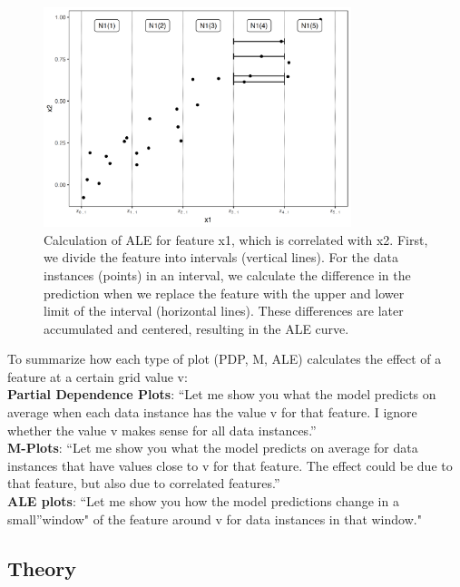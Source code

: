 \documentclass[
  10pt,
]{scrbook}
\begin{document}
\begin{figure}

{\centering \includegraphics[width=0.8\textwidth]{images/aleplot-computation-1} 

}

\caption{Calculation of ALE for feature x1, which is correlated with x2. First, we divide the feature into intervals (vertical lines). For the data instances (points) in an interval, we calculate the difference in the prediction when we replace the feature with the upper and lower limit of the interval (horizontal lines). These differences are later accumulated and centered, resulting in the ALE curve.}\label{fig:aleplot-computation}
\end{figure}

To summarize how each type of plot (PDP, M, ALE) calculates the effect of a feature at a certain grid value v:\\
\textbf{Partial Dependence Plots}: ``Let me show you what the model predicts on average when each data instance has the value v for that feature.
I ignore whether the value v makes sense for all data instances.''\\
\textbf{M-Plots}: ``Let me show you what the model predicts on average for data instances that have values close to v for that feature.
The effect could be due to that feature, but also due to correlated features.''\\
\textbf{ALE plots}: ``Let me show you how the model predictions change in a small''window" of the feature around v for data instances in that window."

\hypertarget{theory-2}{%
\subsection{Theory}\label{theory-2}}
\end{document}
